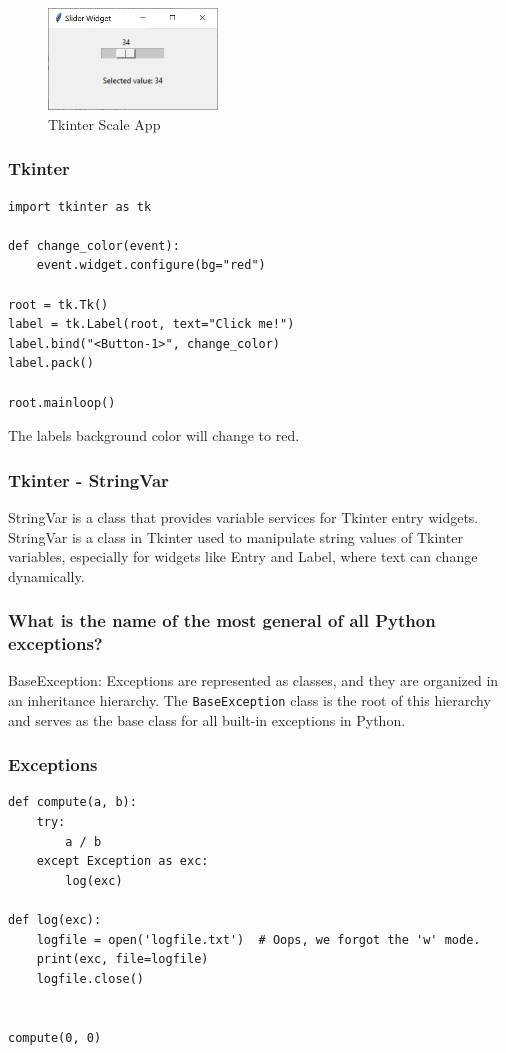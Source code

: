\begin{figure}[h!]
    \centering
    \includegraphics[width=0.4\textwidth]{images/scale_app.JPG}
    \caption{Tkinter Scale App}
    \label{fig:misc-1}
\end{figure}

\newpage
\subsubsection{Tkinter}
\begin{codebox}
\begin{verbatim}
import tkinter as tk
 
def change_color(event):
    event.widget.configure(bg="red")

root = tk.Tk()
label = tk.Label(root, text="Click me!")
label.bind("<Button-1>", change_color)
label.pack()
 
root.mainloop()
\end{verbatim}
\end{codebox}
The labels background color will change to red.

\subsubsection{Tkinter - StringVar}
StringVar is a class that provides variable services for Tkinter entry widgets. StringVar is a class in Tkinter used to manipulate string values of Tkinter variables, especially for widgets like Entry and Label, where text can change dynamically.

\newpage
\subsubsection{What is the name of the most general of all Python exceptions?}

BaseException: Exceptions are represented as classes, and they are organized in an inheritance hierarchy. The \texttt{BaseException} class is the root of this hierarchy and serves as the base class for all built-in exceptions in Python.

\subsubsection{Exceptions}
\begin{codebox}
\begin{verbatim}
def compute(a, b):
    try:
        a / b
    except Exception as exc:
        log(exc)
 
def log(exc):
    logfile = open('logfile.txt')  # Oops, we forgot the 'w' mode.
    print(exc, file=logfile)
    logfile.close()
 
 
compute(0, 0)
\end{verbatim}
\end{codebox}

